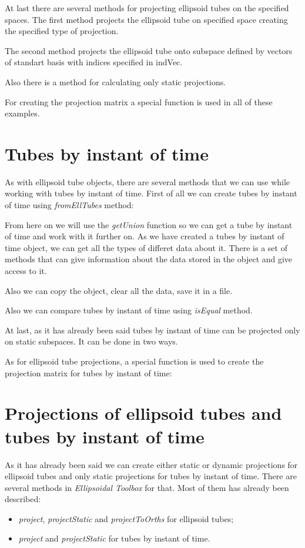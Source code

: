 \documentclass[letterpaper,10pt,english]{sphinxmanual}
\begin{document}
At last there are several methods for projecting ellipsoid tubes on the specified spaces. The first method projects the ellipsoid tube on specified space creating the specified type of projection.

The second method projects the ellipsoid tube onto subspace defined by vectors of standart basis with indices specified in indVec.

Also there is a method for calculating only static projections.

For creating the projection matrix a special function is used in all of these examples.


\section{Tubes by instant of time}
\label{chap_ellTube:tubes-by-instant-of-time}
As with ellipsoid tube objects, there are several methods that we can use while working with tubes by instant of time. First of all we can create tubes by instant of time using \emph{fromEllTubes} method:

From here on we will use the \emph{getUnion} function so we can get a tube by instant of time and work with it further on. As we have created a tubes by instant of time object, we can get all the types of differet data about it. There is a set of methods that can give information about the data stored in the object and give access to it.

Also we can copy the object, clear all the data, save it in a file.

Also we can compare tubes by instant of time using \emph{isEqual} method.

At last, as it has already been said tubes by instant of time can be projected only on static subspaces. It can be done in two ways.

As for ellipsoid tube projections, a special function is used to create the projection matrix for tubes by instant of time:


\section{Projections of ellipsoid tubes and tubes by instant of time}
\label{chap_ellTube:projections-of-ellipsoid-tubes-and-tubes-by-instant-of-time}
As it has already been said we can create either static or dynamic projections for ellipsoid tubes and only static projections for tubes by instant of time. There are several methods in \emph{Ellipsoidal Toolbox} for that. Most of them has already been described:
\begin{itemize}
\item {} 
\emph{project}, \emph{projectStatic} and \emph{projectToOrths} for ellipsoid tubes;

\item {} 
\emph{project} and \emph{projectStatic} for tubes by instant of time.

\end{itemize}
\end{document}
